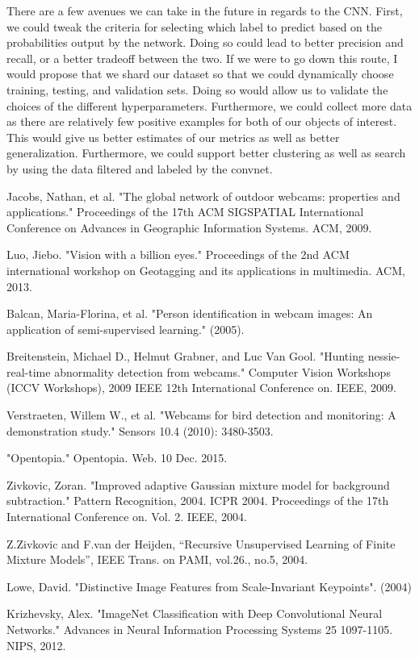 \documentclass[10pt]{article} %
\begin{document}
There are a few avenues we can take in the future in regards to the CNN. First,
we could tweak the criteria for selecting which label to predict based on the
probabilities output by the network. Doing so could lead to better precision
and recall, or a better tradeoff between the two. If we were to go down this
route, I would propose that we shard our dataset so that we could dynamically
choose training, testing, and validation sets. Doing so would allow us to
validate the choices of the different hyperparameters. Furthermore, we could
collect more data as there are relatively few positive examples for both of our
objects of interest. This would give us better estimates of our metrics as well
as better generalization. Furthermore, we could support better clustering as
well as search by using the data filtered and labeled by the convnet.



\begin{thebibliography}{10}
Jacobs, Nathan, et al. "The global network of outdoor webcams: properties and applications." Proceedings of the 17th ACM SIGSPATIAL International Conference on Advances in Geographic Information Systems. ACM, 2009.

Luo, Jiebo. "Vision with a billion eyes." Proceedings of the 2nd ACM international workshop on Geotagging and its applications in multimedia. ACM, 2013.

Balcan, Maria-Florina, et al. "Person identification in webcam images: An application of semi-supervised learning." (2005).

Breitenstein, Michael D., Helmut Grabner, and Luc Van Gool. "Hunting nessie-real-time abnormality detection from webcams." Computer Vision Workshops (ICCV Workshops), 2009 IEEE 12th International Conference on. IEEE, 2009.

Verstraeten, Willem W., et al. "Webcams for bird detection and monitoring: A demonstration study." Sensors 10.4 (2010): 3480-3503.

"Opentopia." Opentopia. Web. 10 Dec. 2015.

Zivkovic, Zoran. "Improved adaptive Gaussian mixture model for background subtraction." Pattern Recognition, 2004. ICPR 2004. Proceedings of the 17th International Conference on. Vol. 2. IEEE, 2004.

Z.Zivkovic and F.van der Heijden, “Recursive Unsupervised Learning of Finite Mixture Models”, IEEE Trans. on PAMI, vol.26., no.5, 2004.

Lowe, David. "Distinctive Image Features from Scale-Invariant Keypoints". (2004)

Krizhevsky, Alex. "ImageNet Classification with Deep Convolutional Neural Networks." Advances in Neural Information Processing Systems 25 1097-1105. NIPS, 2012.




\end{thebibliography}
\end{document}
